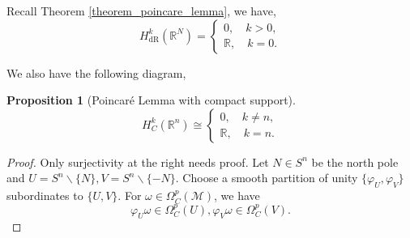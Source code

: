 \documentclass[10pt]{article}
\newtheorem{proposition}{Proposition}[section]
\DeclareMathOperator{\dR}{dR}
\newcommand{\R}[0]{\mathbb{R}}
\newcommand{\M}[0]{\mathcal{M}}
\begin{document}
Recall Theorem \ref{theorem_poincare_lemma}, we have,
\begin{equation*}
  H^k_{\dR}(\R^N)=\begin{cases}
    0,\quad k>0,\\
    \R, \quad k=0.
  \end{cases}
\end{equation*}

We also have the following diagram,

\begin{center}
\end{center}
\begin{proposition}[Poincaré Lemma with compact support]
  \begin{equation*}
    H_C^k(\R^n)\cong\begin{cases}
      0,\quad k\not=n,\\
      \R,\quad k=n.
    \end{cases}
  \end{equation*}
\end{proposition}

\begin{proof}
  Only surjectivity at the right needs proof. Let $N\in S^n$ be the north pole and $U=S^n\backslash \{N\},V=S^n\backslash \{-N\}$. Choose a smooth partition of unity $\{\varphi_U,\varphi_V\}$ subordinates to $\{U,V\}$. For $\omega\in\Omega^p_C(\M)$, we have 
  \begin{equation*}
    \varphi_U\omega\in\Omega_C^p(U),\varphi_V\omega\in\Omega_C^p(V).
  \end{equation*}
\end{proof}
\end{document}
